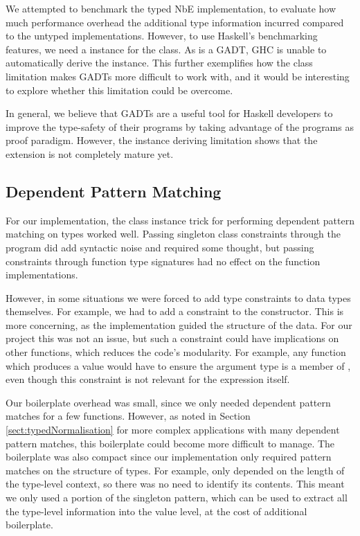 We attempted to benchmark the typed NbE implementation, to evaluate how much performance overhead the additional type information incurred compared to the untyped implementations. However, to use Haskell's benchmarking features, we need a  instance for the  class. As  is a GADT, GHC is unable to automatically derive the instance. This further exemplifies how the class limitation makes GADTs more difficult to work with, and it would be interesting to explore whether this limitation could be overcome.

In general, we believe that GADTs are a useful tool for Haskell developers to improve the type-safety of their programs by taking advantage of the programs as proof paradigm. However, the instance deriving limitation shows that the extension is not completely mature yet. 

\subsection{Dependent Pattern Matching}

For our implementation, the class instance trick for performing dependent pattern matching on types worked well. Passing singleton class constraints through the program did add syntactic noise and required some thought, but passing constraints through function type signatures had no effect on the function implementations. 

However, in some situations we were forced to add type constraints to data types themselves. For example, we had to add a  constraint to the  constructor. This is more concerning, as the implementation guided the structure of the data. For our project this was not an issue, but such a constraint could have implications on other functions, which reduces the code's modularity. For example, any function which produces a  value would have to ensure the argument type is a member of , even though this constraint is not relevant for the expression itself.

Our boilerplate overhead was small, since we only needed dependent pattern matches for a few functions. However, as noted in Section \ref{sect:typedNormalisation} for more complex applications with many dependent pattern matches, this boilerplate could become more difficult to manage. The boilerplate was also compact since our implementation only required pattern matches on the structure of types. For example,  only depended on the length of the type-level context, so there was no need to identify its contents. This meant we only used a portion of the singleton pattern, which can be used to extract all the type-level information into the value level, at the cost of additional boilerplate.

